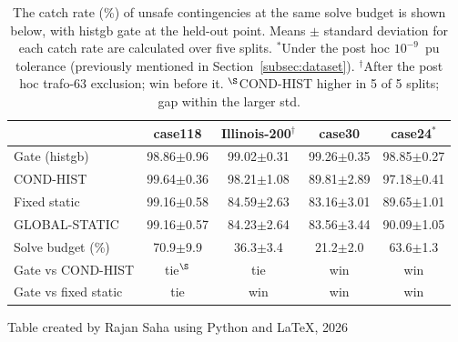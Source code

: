 \documentclass[12pt]{article}
\begin{document}
\begin{table}[htbp]
\centering
\caption{The catch rate (\%) of unsafe contingencies at the same solve budget is shown below, with histgb gate at the held-out point. Means $\pm$ standard deviation for each catch rate are calculated over five splits. $^{*}$Under the post hoc $10^{-9}$~pu tolerance (previously mentioned in Section~\ref{subsec:dataset}). $^{\dagger}$After the post hoc trafo-63 exclusion; win before it. $^{\S}$COND-HIST higher in 5 of 5 splits; gap within the larger std.}
\label{tab:networks}
\small
\setlength{\tabcolsep}{4pt}
\begin{tabular}{lcccc}
\toprule
 & case118 & Illinois-200$^{\dagger}$ & case30 & case24$^{*}$ \\
\midrule
Gate (histgb)  & 98.86$\pm$0.96 & 99.02$\pm$0.31 & 99.26$\pm$0.35 & 98.85$\pm$0.27 \\
COND-HIST      & 99.64$\pm$0.36 & 98.21$\pm$1.08 & 89.81$\pm$2.89 & 97.18$\pm$0.41 \\
Fixed static   & 99.16$\pm$0.58 & 84.59$\pm$2.63 & 83.16$\pm$3.01 & 89.65$\pm$1.01 \\
GLOBAL-STATIC  & 99.16$\pm$0.57 & 84.23$\pm$2.64 & 83.56$\pm$3.44 & 90.09$\pm$1.05 \\
\midrule
Solve budget (\%) & 70.9$\pm$9.9 & 36.3$\pm$3.4 & 21.2$\pm$2.0 & 63.6$\pm$1.3 \\
Gate vs COND-HIST & tie$^{\S}$ & tie & win & win \\
Gate vs fixed static & tie & win & win & win \\
\bottomrule
\end{tabular}

\vspace*{1ex}
{\small Table created by Rajan Saha using Python and \LaTeX, 2026}
\end{table}
\end{document}
